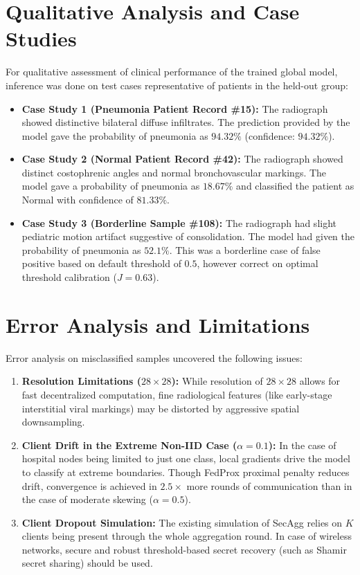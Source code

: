 \documentclass[12pt,a4paper]{report}
\begin{document}
\section{Qualitative Analysis and Case Studies}
For qualitative assessment of clinical performance of the trained global model, inference was done on test cases representative of patients in the held-out group:
\begin{itemize}
    \item \textbf{Case Study 1 (Pneumonia Patient Record \#15):} The radiograph showed distinctive bilateral diffuse infiltrates. The prediction provided by the model gave the probability of pneumonia as $94.32\%$ (confidence: $94.32\%$).
    \item \textbf{Case Study 2 (Normal Patient Record \#42):} The radiograph showed distinct costophrenic angles and normal bronchovascular markings. The model gave a probability of pneumonia as $18.67\%$ and classified the patient as Normal with confidence of $81.33\%$.
    \item \textbf{Case Study 3 (Borderline Sample \#108):} The radiograph had slight pediatric motion artifact suggestive of consolidation. The model had given the probability of pneumonia as $52.1\%$. This was a borderline case of false positive based on default threshold of $0.5$, however correct on optimal threshold calibration ($J = 0.63$).
\end{itemize}

\section{Error Analysis and Limitations}
Error analysis on misclassified samples uncovered the following issues:
\begin{enumerate}
    \item \textbf{Resolution Limitations ($28 \times 28$):} While resolution of $28 \times 28$ allows for fast decentralized computation, fine radiological features (like early-stage interstitial viral markings) may be distorted by aggressive spatial downsampling.
    \item \textbf{Client Drift in the Extreme Non-IID Case ($\alpha = 0.1$):} In the case of hospital nodes being limited to just one class, local gradients drive the model to classify at extreme boundaries. Though FedProx proximal penalty reduces drift, convergence is achieved in $2.5 \times$ more rounds of communication than in the case of moderate skewing ($\alpha = 0.5$).
    \item \textbf{Client Dropout Simulation:} The existing simulation of SecAgg relies on $K$ clients being present through the whole aggregation round. In case of wireless networks, secure and robust threshold-based secret recovery (such as Shamir secret sharing) should be used.
\end{enumerate}
\end{document}
